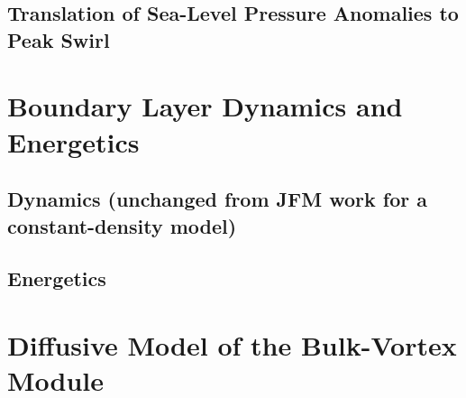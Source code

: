 \documentclass{article}
\begin{document}
\subsection{Translation of Sea-Level Pressure Anomalies to Peak Swirl}


\section{Boundary Layer Dynamics and Energetics}

\subsection{Dynamics (unchanged from JFM work for a constant-density model)}

\subsection{Energetics}

\section{Diffusive Model of the Bulk-Vortex Module}

\begin{figure}[h!]
	\centering
	\def\svgwidth{0.7\columnwidth}
	
\end{figure}
\end{document}
